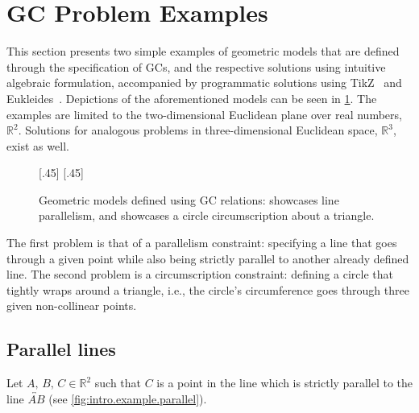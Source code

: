 \section{\acl{GC} Problem Examples}%
\label{sec:intro.examples}

This section presents two simple examples of geometric models that are defined
through the specification of \acp{GC}, and the respective solutions using
intuitive algebraic formulation, accompanied by programmatic solutions using
\acs{TikZ}~\cite{Tantau:2021:TikZ} and Eukleides~\cite{Obrecht:2010:EM}.
Depictions of the aforementioned models can be seen in \cref{fig:intro.example}.
The examples are limited to the two-dimensional Euclidean plane over real
numbers, $\mathbb{R}^2$.  Solutions for analogous problems in three-dimensional
Euclidean space, $\mathbb{R}^3$, exist as well.

\begin{figure}[htpb]
    [.45\linewidth]{\resizebox{!}{.2\textheight}{%
      }}
  \hspace{\fill}
    [.45\linewidth]{\resizebox{!}{.2\textheight}{%
      }}
  \caption[Geometric models defined using GCs]{
    Geometric models defined using \ac{GC} relations:
     showcases line parallelism, and
     showcases a circle circumscription
    about a triangle.}\label{fig:intro.example}
\end{figure}

The first problem is that of a parallelism constraint: specifying a line that
goes through a given point while also being strictly parallel to another already
defined line.  The second problem is a circumscription constraint: defining a
circle that tightly wraps around a triangle, i.e., the circle's circumference
goes through three given non-collinear points.

\subsection{Parallel lines}%
\label{sec:intro.examples.parallel}

Let $A,\,B,\,C \in \mathbb{R}^2$ such that $C$ is a point in the line which is
strictly parallel to the line $\overleftrightarrow{AB}$ (see
\cref{fig:intro.example.parallel}).

